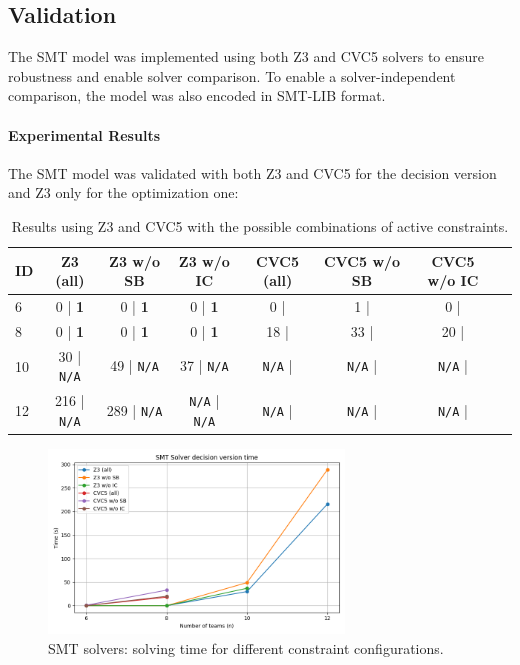 \documentclass[11pt]{article}
\begin{document}
\subsection{Validation}

The SMT model was implemented using both Z3 and CVC5 solvers to ensure robustness and enable solver comparison. To enable a solver-independent comparison, the model was also encoded in SMT-LIB format.

\paragraph{Experimental Results}

The SMT model was validated with both Z3 and CVC5 for the decision version and Z3 only for the optimization one:

\begin{table}[H]
\centering
\small
\label{tab:smt}
\begin{tabular}{@{}lccccccc@{}}
\toprule
ID & Z3 (all) & Z3 w/o SB & Z3 w/o IC & CVC5 (all) & CVC5 w/o SB & CVC5 w/o IC \\
\midrule
6 & 0 | \textbf{1} & 0 | \textbf{1} & 0 | \textbf{1} &  0 | &  1 | &  0 |\\
8 & 0 | \textbf{1} & 0 | \textbf{1} & 0 | \textbf{1} & 18 | & 33 | & 20 |\\
10 &  30 | \texttt{N/A} &  49 | \texttt{N/A} &  37 | \texttt{N/A} & \texttt{N/A} | & \texttt{N/A} | & \texttt{N/A} |\\
12 &  216 | \texttt{N/A} &  289 | \texttt{N/A} & \texttt{N/A} | \texttt{N/A} & \texttt{N/A} | & \texttt{N/A} | & \texttt{N/A} |\\
\bottomrule
\end{tabular}
\caption{Results using Z3 and CVC5 with the possible combinations of active constraints.}
\end{table}

\begin{figure}[H]
    \centering
    \includegraphics[width=0.7\textwidth]{SMT_solvers.png}
    \caption{SMT solvers: solving time for different constraint configurations.}
    \label{fig:smt_plot}
\end{figure}
\end{document}
